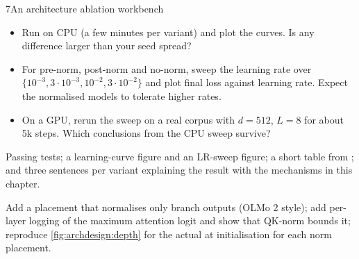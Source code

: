 \begin{labbox}{7}{An architecture ablation workbench}
\begin{itemize}
\item Run  on CPU (a few minutes per variant) and plot the curves. Is
  any difference larger than your seed spread?
\item For pre-norm, post-norm and no-norm, sweep the learning rate over $\{10^{-3},3\cdot10^{-3},10^{-2},
  3\cdot10^{-2}\}$ and plot final loss against learning rate. Expect the normalised models to tolerate
  higher rates.
\item On a GPU, rerun the sweep on a real corpus with $d=512$, $L=8$ for about 5k steps. Which conclusions
  from the CPU sweep survive?
\end{itemize}

Passing tests; a learning-curve figure and an LR-sweep figure; a short table from
; and three sentences per variant explaining the result with the mechanisms in
this chapter.

Add a  placement that normalises only branch outputs (OLMo 2 style); add per-layer logging
of the maximum attention logit and show that QK-norm bounds it; reproduce \cref{fig:archdesign:depth}
for the actual  at initialisation for each norm placement.
\end{labbox}
